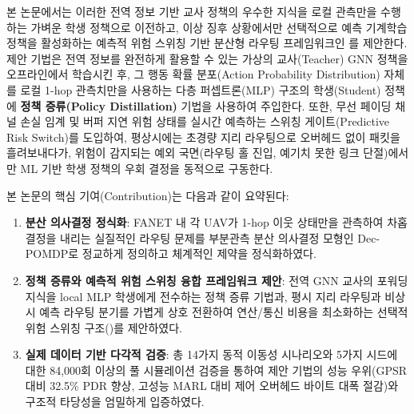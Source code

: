 본 논문에서는 이러한 전역 정보 기반 교사 정책의 우수한 지식을 로컬 관측만을 수행하는 가벼운 학생 정책으로 이전하고, 이상 징후 상황에서만 선택적으로 예측 기계학습 정책을 활성화하는 예측적 위험 스위칭 기반 분산형 라우팅 프레임워크인 \textbf{\method}를 제안한다. 제안 기법은 전역 정보를 완전하게 활용할 수 있는 가상의 교사(Teacher) GNN 정책을 오프라인에서 학습시킨 후, 그 행동 확률 분포(Action Probability Distribution) 자체를 로컬 1-hop 관측치만을 사용하는 다층 퍼셉트론(MLP) 구조의 학생(Student) 정책에 \textbf{정책 증류(Policy Distillation)}\cite{rusu2016policy} 기법을 사용하여 주입한다. 또한, 무선 페이딩 채널 손실 임계 및 버퍼 지연 위험 상태를 실시간 예측하는 스위칭 게이트(Predictive Risk Switch)를 도입하여, 평상시에는 초경량 지리 라우팅으로 오버헤드 없이 패킷을 흘려보내다가, 위험이 감지되는 예외 국면(라우팅 홀 진입, 예기치 못한 링크 단절)에서만 ML 기반 학생 정책의 우회 결정을 동적으로 구동한다.

본 논문의 핵심 기여(Contribution)는 다음과 같이 요약된다:
\begin{enumerate}
    \item \textbf{분산 의사결정 정식화}: FANET 내 각 UAV가 1-hop 이웃 상태만을 관측하여 차홉 결정을 내리는 실질적인 라우팅 문제를 부분관측 분산 의사결정 모형인 Dec-POMDP로 정교하게 정의하고 체계적인 제약을 정식화하였다.
    \item \textbf{정책 증류와 예측적 위험 스위칭 융합 프레임워크 제안}: 전역 GNN 교사의 포워딩 지식을 local MLP 학생에게 전수하는 정책 증류 기법과, 평시 지리 라우팅과 비상시 예측 라우팅 분기를 가볍게 상호 전환하여 연산/통신 비용을 최소화하는 선택적 위험 스위칭 구조(\method)를 제안하였다.
    \item \textbf{실제 데이터 기반 다각적 검증}: 총 14가지 동적 이동성 시나리오와 5가지 시드에 대한 84,000회 이상의 풀 시뮬레이션 검증을 통하여 제안 기법의 성능 우위(GPSR 대비 32.5\% PDR 향상, 고성능 MARL 대비 제어 오버헤드 바이트 대폭 절감)와 구조적 타당성을 엄밀하게 입증하였다.
\end{enumerate}
